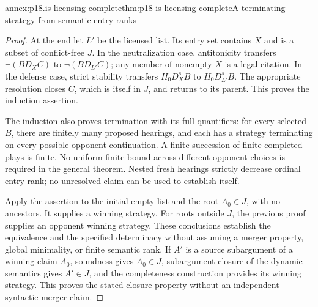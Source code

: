 \begin{annexitem}{annex:p18.is-licensing-complete}{thm:p18-is-licensing-complete}{A terminating strategy from semantic entry ranks}
\begin{proof}
At the end let \(L'\) be the licensed list. Its entry set contains
\(X\) and is a subset of conflict-free \(J\).
In the neutralization case, antitonicity transfers
\(\neg(B D_XC)\) to \(\neg(B D_{L'}C)\); any member of
nonempty \(X\) is a legal citation.
In the defense case, strict stability transfers
\(H_0D_X^sB\) to \(H_0D_{L'}^sB\).
The appropriate resolution closes \(C\), which is itself in \(J\),
and returns to its parent. This proves the induction assertion.

The induction also proves termination with its full quantifiers:
for every selected \(B\), there are finitely many proposed
hearings, and each has a strategy terminating on every possible
opponent continuation. A finite succession of finite completed
plays is finite. No uniform finite bound across different
opponent choices is required in the general theorem.
Nested fresh hearings strictly decrease ordinal entry rank;
no unresolved claim can be used to establish itself.

Apply the assertion to the initial empty list and the root
\(A_0\in J\), with no ancestors. It supplies a winning strategy.
For roots outside \(J\), the previous proof supplies an opponent
winning strategy. These conclusions establish the equivalence
and the specified determinacy without assuming a merger property,
global minimality, or finite semantic rank.
If \(A'\) is a source subargument of a winning claim \(A_0\),
soundness gives \(A_0\in J\), subargument closure of the dynamic
semantics gives \(A'\in J\), and the completeness construction
provides its winning strategy. This proves the stated closure
property without an independent syntactic merger claim.
\end{proof}
\end{annexitem}

